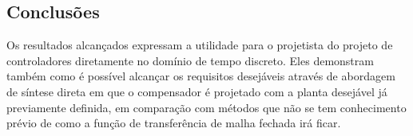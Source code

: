 



\subsection{Conclusões}
Os resultados alcançados expressam a utilidade para o projetista do projeto de
controladores diretamente no domínio de tempo discreto. Eles demonstram também
como é possível alcançar os requisitos desejáveis através de abordagem de
síntese direta em que o compensador é projetado com a planta desejável já
previamente definida, em comparação com métodos que não se tem conhecimento
prévio de como a função de transferência de malha fechada irá ficar.
